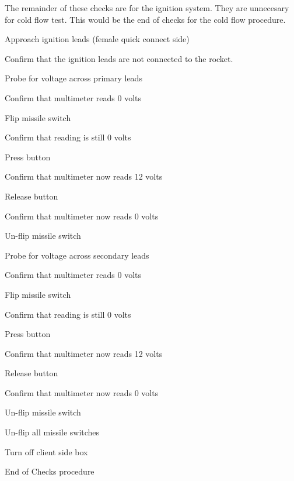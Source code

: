 The remainder of these checks are for the ignition system. They are 
unnecesary for cold flow test. This would be the end of checks for the 
cold flow procedure.
\begin{checklist}
    \item Approach ignition leads (female quick connect side)
    \item Confirm that the ignition leads are not connected to the rocket.
    \item Probe for voltage across primary leads
    \begin{checklist}
        \item Confirm that multimeter reads 0 volts
    \end{checklist}
    \item Flip \priarm{} missile switch
    \begin{checklist}
        \item Confirm that reading is still 0 volts
    \end{checklist}
    \item Press \fire{} button
    \begin{checklist}
        \item Confirm that multimeter now reads 12 volts
    \end{checklist}
    \item Release \fire{} button
    \begin{checklist}
        \item Confirm that multimeter now reads 0 volts
    \end{checklist}
    \item Un-flip \priarm{} missile switch

    \item Probe for voltage across secondary leads
    \begin{checklist}
        \item Confirm that multimeter reads 0 volts
    \end{checklist}
    \item Flip \secarm{} missile switch
    \begin{checklist}
        \item Confirm that reading is still 0 volts
    \end{checklist}
    \item Press \fire{} button
    \begin{checklist}
        \item Confirm that multimeter now reads 12 volts
    \end{checklist}
    \item Release \fire{} button
    \begin{checklist}
        \item Confirm that multimeter now reads 0 volts
    \end{checklist}
    \item Un-flip \secarm{} missile switch

    \item Un-flip all missile switches
    \item Turn off client side box
\end{checklist}
End of Checks procedure




